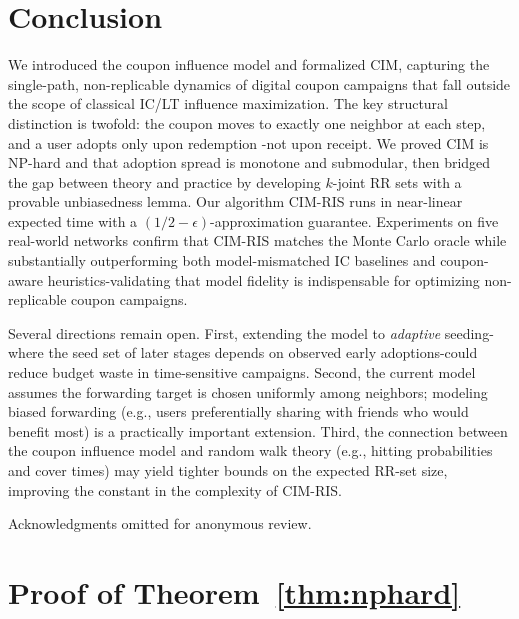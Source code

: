 \documentclass[sigconf]{acmart}
\newcommand{\CIMRIS}{\textsc{CIM-RIS}}
\begin{document}
\section{Conclusion}
\label{sec:conclusion}

We introduced the coupon influence model and formalized CIM, capturing the
single-path, non-replicable dynamics of digital coupon campaigns that
fall outside the scope of classical IC/LT influence maximization.
The key structural distinction is twofold: the coupon moves to exactly
one neighbor at each step, and a user adopts only upon redemption
-not upon receipt.
We proved CIM is NP-hard and that adoption spread is monotone and
submodular, then bridged the gap between theory and practice by
developing $k$-joint RR sets with a provable unbiasedness lemma.
Our algorithm \CIMRIS{} runs in near-linear expected time with a
$(1/2{-}\epsilon)$-approximation guarantee.
Experiments on five real-world networks confirm that \CIMRIS{} matches
the Monte Carlo oracle while substantially outperforming both
model-mismatched IC baselines and coupon-aware heuristics-validating
that model fidelity is indispensable for optimizing non-replicable
coupon campaigns.

Several directions remain open.
First, extending the model to \emph{adaptive} seeding-where the
seed set of later stages depends on observed early adoptions-could
reduce budget waste in time-sensitive campaigns.
Second, the current model assumes the forwarding target is chosen
uniformly among neighbors; modeling biased forwarding
(e.g., users preferentially sharing with friends who would benefit
most) is a practically important extension.
Third, the connection between the coupon influence model and random walk theory
(e.g., hitting probabilities and cover times) may yield tighter bounds
on the expected RR-set size, improving the constant in the complexity
of \CIMRIS{}.

\begin{acks}
Acknowledgments omitted for anonymous review.
\end{acks}





\appendix
\section{Proof of Theorem~\ref{thm:nphard}}
\label{app:hardness}
\end{document}
